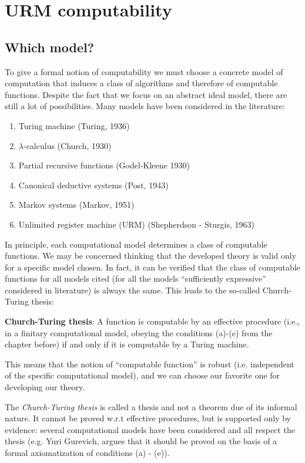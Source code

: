 \chapter{URM computability}

\section {Which model?}

To give a formal notion of computability we must choose a concrete model of computation that induces a class of algorithms and therefore of computable functions. 
Despite the fact that we focus on an abstract ideal model, there are still a lot of possibilities. Many models have been considered in the literature:

\begin{enumerate}
\item Turing machine (Turing, 1936)
\item $\lambda$-calculus (Church, 1930)
\item Partial recursive functions (Godel-Kleene 1930)
\item Canonical deductive systems (Post, 1943)
\item Markov systems (Markov, 1951)
\item Unlimited register machine (URM) (Shepherdson - Sturgis, 1963)
\end{enumerate}

In principle, each computational model determines a class of computable functions.
We may be concerned thinking that the developed theory is valid only for a specific
model chosen. In fact, it can be verified that the class of computable functions for all
models cited (for all the models ``sufficiently expressive'' considered
in literature) is always the same. This leads to the so-called Church-Turing
thesis:

\textbf{Church-Turing thesis}: A function is computable by an
effective procedure (i.e., in a finitary computational model, obeying the conditions (a)-(e) from the chapter before) if and only if it is computable
by a Turing machine.


This means that the notion of ``computable function'' is robust (i.e. independent of the specific computational model), and we can choose our favorite one for developing our theory.

\begin{remark}
  The \emph{Church-Turing thesis} is called a thesis and not a theorem due
  of its informal nature. 
  It cannot be proved w.r.t effective procedures, but is supported only by evidence: 
  several computational models have been considered and all respect the thesis 
  (e.g. Yuri Gurevich, argues that it should be proved on the basis of a formal
  axiomatization of conditions (a) - (e)).
\end{remark}

